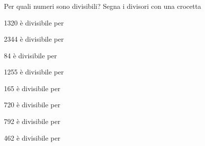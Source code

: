 \subsubsection*{}

\begin{esercizio}
\label{ese:1.18}
 Per quali numeri sono divisibili? Segna i divisori con una crocetta
\TabPositions{3.5cm}
 \begin{enumeratea}
 \item 1320 è divisibile per \tab{}\enspace{}\enspace{}\enspace{}\enspace{}\enspace{}\enspace{}\enspace{}\enspace{}\enspace{}
 \item 2344 è divisibile per \tab{}\enspace{}\enspace{}\enspace{}\enspace{}\enspace{}\enspace{}\enspace{}\enspace{}\enspace{}
 \item 84 è divisibile per \tab{}\enspace{}\enspace{}\enspace{}\enspace{}\enspace{}\enspace{}\enspace{}\enspace{}\enspace{}
 \item 1255 è divisibile per \tab{}\enspace{}\enspace{}\enspace{}\enspace{}\enspace{}\enspace{}\enspace{}\enspace{}\enspace{}
 \item 165 è divisibile per \tab{}\enspace{}\enspace{}\enspace{}\enspace{}\enspace{}\enspace{}\enspace{}\enspace{}\enspace{}
 \item 720 è divisibile per \tab{}\enspace{}\enspace{}\enspace{}\enspace{}\enspace{}\enspace{}\enspace{}\enspace{}\enspace{}
 \item 792 è divisibile per \tab{}\enspace{}\enspace{}\enspace{}\enspace{}\enspace{}\enspace{}\enspace{}\enspace{}\enspace{}
 \item 462 è divisibile per \tab{}\enspace{}\enspace{}\enspace{}\enspace{}\enspace{}\enspace{}\enspace{}\enspace{}\enspace{}
 \end{enumeratea}
\end{esercizio}

